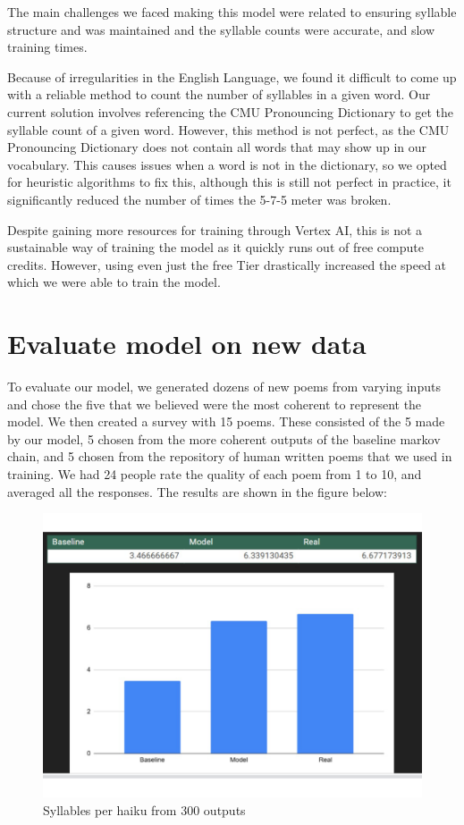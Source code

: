 \documentclass{article} %
\begin{document}
The main challenges we faced making this model were
related to ensuring syllable structure and was maintained and the syllable counts were accurate, and
slow training times.

Because of irregularities in the English Language, we found it difficult to
come up with a reliable method to count the number of syllables in a given word. Our current solution involves referencing
the CMU Pronouncing Dictionary \citep{cmu_pronouncing_dictionary} to get the syllable count of a given word.
However, this method is not perfect, as the CMU Pronouncing Dictionary does not contain all words that may show up in our vocabulary.
This causes issues when a word is not in the dictionary, so we opted for heuristic algorithms to fix this,
although this is still not perfect in practice, it significantly reduced the number of times the 5-7-5 meter was broken.

Despite gaining more resources for training through Vertex AI,
this is not a sustainable way of training the model as it quickly runs out of free compute credits.
However, using even just the free Tier drastically increased the speed at which we were able to train the model.

\section{Evaluate model on new data}
To evaluate our model, we generated dozens of new poems from varying inputs and chose the five that we believed were the most coherent to represent the model. We then created a survey with 15 poems. These consisted of the 5 made by our model, 5 chosen from the more coherent outputs of the baseline markov chain, and 5 chosen from the repository of human written poems that we used in training. We had 24 people rate the quality of each poem from 1 to 10, and averaged all the responses. The results are shown in the figure below:

\begin{figure}[h]
  \begin{center}
  \includegraphics[width=1\textwidth]{Figs/survey_results.png}
  \end{center}
  \caption{Syllables per haiku from 300 outputs}
  \label{fig:plot2}
\end{figure}
\FloatBarrier
\end{document}
